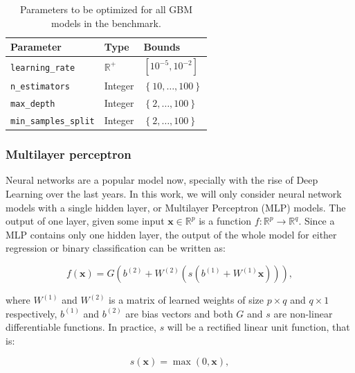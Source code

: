 \documentclass[10pt,a4paper,twoside]{book}
\begin{document}
\begin{table}[]
\centering
\caption{Parameters to be optimized for all GBM models in the benchmark.}
\label{gbmparam}
\begin{tabular}{@{}lll@{}}
\toprule
\textbf{Parameter}             & \textbf{Type}  & \textbf{Bounds}                          \\ \midrule
\texttt{learning\_rate}      & $\mathbb{R}^+$ & $\left[10^{-5}, 10^{-2}\right]$                         \\
\texttt{n\_estimators}       & Integer        & $\left\lbrace 10,\dots, 100 \right\rbrace$ \\
\texttt{max\_depth}          & Integer        & $\left\lbrace 2, \dots, 100 \right\rbrace$ \\
\texttt{min\_samples\_split}  & Integer        & $\left\lbrace 2, \dots, 100 \right\rbrace$
\end{tabular}
\end{table}

\subsubsection{Multilayer perceptron}

Neural networks are a popular model now, specially with the rise of Deep Learning \cite{LeCun2015} over the last years. In this work, we will only consider neural network models with a single hidden layer, or Multilayer Perceptron (MLP) models. The output of one layer, given some input $\boldsymbol{x}\in \mathbb{R}^p$ is a function $f:\mathbb{R}^p \rightarrow \mathbb{R}^q$. Since a MLP contains only one hidden layer, the output of the whole model for either regression or binary classification can be written as:

\begin{equation}
f(\boldsymbol{x}) = G\left(b^{(2)} + W^{(2)}\left(s \left( b^{(1)} + W^{(1)}\boldsymbol{x}\right)\right)\right),
\end{equation}

where $W^{(1)}$ and $W^{(2)}$ is a matrix of learned weights of size $p \times q$ and $q \times 1$ respectively, $b^{(1)}$ and $b^{(2)}$ are bias vectors and both $G$ and $s$ are non-linear differentiable functions. In practice, $s$ will be a rectified linear unit function, that is:

\begin{equation}
s(\boldsymbol{x}) = \max \left(0, \boldsymbol{x} \right),
\end{equation}
\end{document}

